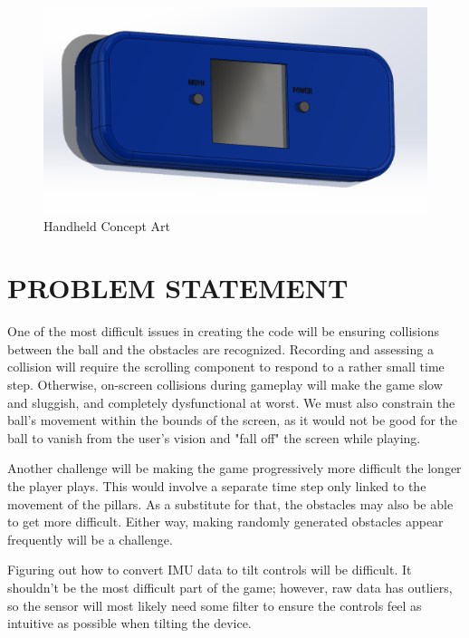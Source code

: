 \documentclass[12pt]{article}
\begin{document}
\begin{figure}[!t]
\centering
\includegraphics[width=4.5in]{concept art 361.png}
\caption{Handheld Concept Art}
\label{fig:cpx}
\end{figure}

\newpage
\section{PROBLEM STATEMENT}
One of the most difficult issues in creating the code will be ensuring collisions between the ball and the obstacles are recognized. Recording and assessing a collision will require the scrolling component to respond to a rather small time step. Otherwise, on-screen collisions during gameplay will make the game slow and sluggish, and completely dysfunctional at worst. We must also constrain the ball's movement within the bounds of the screen, as it would not be good for the ball to vanish from the user's vision and "fall off" the screen while playing.  

Another challenge will be making the game progressively more difficult the longer the player plays. This would involve a separate time step only linked to the movement of the pillars. As a substitute for that, the obstacles may also be able to get more difficult. Either way, making randomly generated obstacles appear frequently will be a challenge. 

Figuring out how to convert IMU data to tilt controls will be difficult. It shouldn't be the most difficult part of the game; however, raw data has outliers, so the sensor will most likely need some filter to ensure the controls feel as intuitive as possible when tilting the device.
\end{document}
